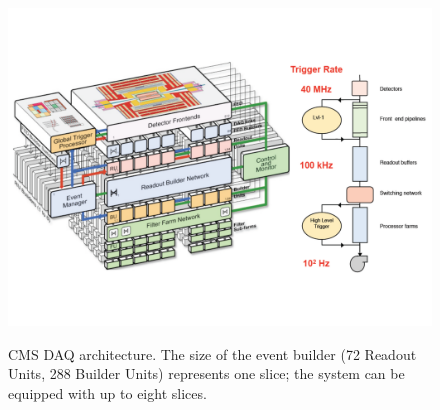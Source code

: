 \documentclass{JINST}
\begin{document}
\begin{figure}[!Hhtb]
  \begin{center}
    \includegraphics[width=1.0\textwidth]{figs/CMSTrigger.pdf} \label{fig:hltarc}
      \caption{CMS DAQ architecture. The size of the event builder (72 Readout Units, 288 Builder Units) represents one slice; the system can be equipped with up to eight slices.}
  \end{center}
\end{figure}
\end{document}
